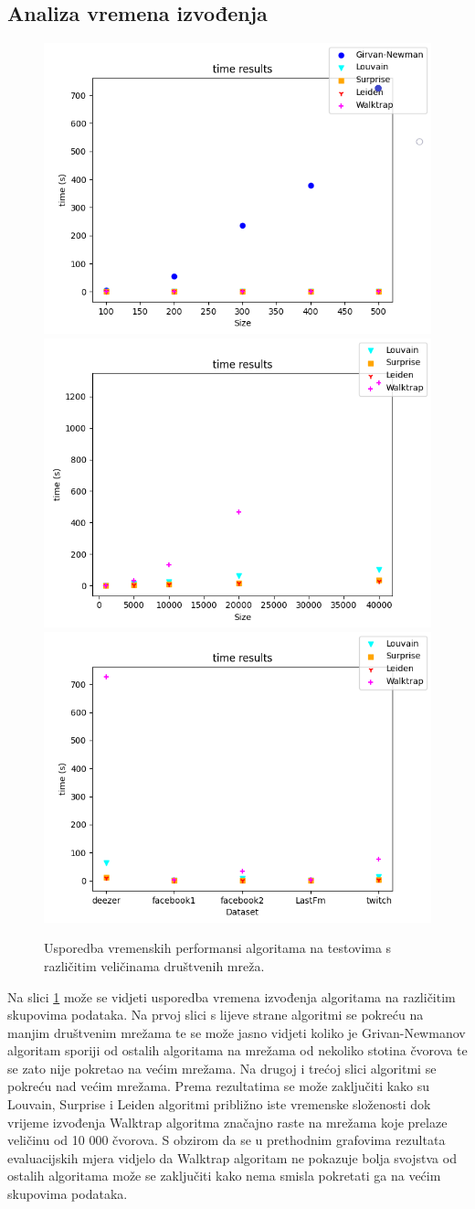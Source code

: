 \documentclass[times, utf8, diplomski]{fer}
\begin{document}
\subsection{Analiza vremena izvođenja}

\begin{figure}[htp]
	
	\centering
	\includegraphics[width=.3\textwidth]{images/Figure_2_test1_time.png}\hfill
	\includegraphics[width=.3\textwidth]{images/Figure_2_test2_time.png}\hfill
	\includegraphics[width=.3\textwidth]{images/Figure_2_test3_time.png}
	\caption{Usporedba vremenskih performansi algoritama na testovima s različitim veličinama društvenih mreža.}
	\label{fig:time_comparison}
	
\end{figure}

Na slici \ref{fig:time_comparison} može se vidjeti usporedba vremena izvođenja algoritama na različitim skupovima podataka. Na prvoj slici s lijeve strane algoritmi se pokreću na manjim društvenim mrežama te se može jasno vidjeti koliko je Grivan-Newmanov algoritam sporiji od ostalih algoritama na mrežama od nekoliko stotina čvorova te se zato nije pokretao na većim mrežama. Na drugoj i trećoj slici algoritmi se pokreću nad većim mrežama. Prema rezultatima se može zaključiti kako su Louvain, Surprise i Leiden algoritmi približno iste vremenske složenosti dok vrijeme izvođenja Walktrap algoritma značajno raste na mrežama koje prelaze veličinu od 10 000 čvorova. S obzirom da se u prethodnim grafovima rezultata evaluacijskih mjera vidjelo da Walktrap algoritam ne pokazuje bolja svojstva od ostalih algoritama može se zaključiti kako nema smisla pokretati ga na većim skupovima podataka.
\end{document}
